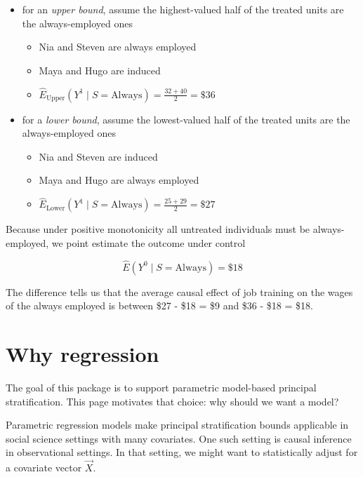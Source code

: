 \documentclass[
]{book}
\providecommand{\tightlist}{%
  \setlength{\itemsep}{0pt}\setlength{\parskip}{0pt}}
\begin{document}
\begin{itemize}
\tightlist
\item
  for an \emph{upper bound}, assume the highest-valued half of the treated units are the always-employed ones

  \begin{itemize}
  \tightlist
  \item
    Nia and Steven are always employed
  \item
    Maya and Hugo are induced
  \item
    \(\hat{E}_\text{Upper}(Y^1\mid S = \text{Always}) = \frac{32+40}{2} = \$36\)
  \end{itemize}
\item
  for a \emph{lower bound}, assume the lowest-valued half of the treated units are the always-employed ones

  \begin{itemize}
  \tightlist
  \item
    Nia and Steven are induced
  \item
    Maya and Hugo are always employed
  \item
    \(\hat{E}_\text{Lower}(Y^1\mid S = \text{Always}) = \frac{25+29}{2} = \$27\)
  \end{itemize}
\end{itemize}

Because under positive monotonicity all untreated individuals must be always-employed, we point estimate the outcome under control

\[\hat{E}(Y^0\mid S = \text{Always}) = \$18\]

The difference tells us that the average causal effect of job training on the wages of the always employed is between \$27 - \$18 = \$9 and \$36 - \$18 = \$18.

\hypertarget{why-regression}{%
\chapter{Why regression}\label{why-regression}}

The goal of this package is to support parametric model-based principal stratification. This page motivates that choice: why should we want a model?

Parametric regression models make principal stratification bounds applicable in social science settings with many covariates. One such setting is causal inference in observational settings. In that setting, we might want to statistically adjust for a covariate vector \(\vec{X}\).
\end{document}
